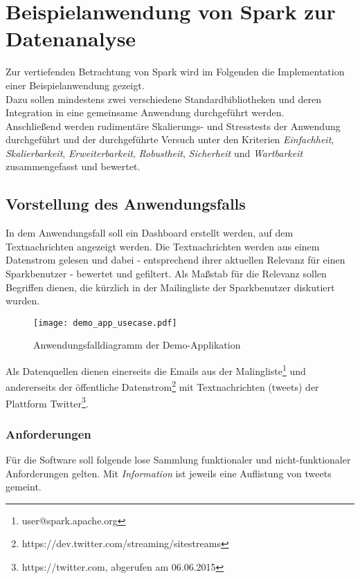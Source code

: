 \chapter{Beispielanwendung von Spark zur Datenanalyse}

Zur vertiefenden Betrachtung von Spark wird im Folgenden die Implementation einer Beispielanwendung gezeigt.\\

Dazu sollen mindestens zwei verschiedene Standardbibliotheken und deren Integration in eine gemeinsame Anwendung durchgeführt werden.\\

Anschließend werden rudimentäre Skalierungs- und Stresstests der Anwendung durchgeführt und der durchgeführte Versuch unter den Kriterien \textit{Einfachheit}, \textit{Skalierbarkeit}, \textit{Erweiterbarkeit}, \textit{Robustheit}, \textit{Sicherheit} und \textit{Wartbarkeit} zusammengefasst und bewertet.

\section{Vorstellung des Anwendungsfalls}
In dem Anwendungsfall soll ein Dashboard erstellt werden, auf dem Textnachrichten angezeigt werden.
Die Textnachrichten werden aus einem Datenstrom gelesen und dabei - entsprechend ihrer aktuellen Relevanz für einen Sparkbenutzer - bewertet und gefiltert. Als Maßstab für die Relevanz sollen Begriffen dienen, die kürzlich in der Mailingliste der Sparkbenutzer diskutiert wurden.\\

\begin{figure}[ht!]
	\centering
  \texttt{[image: demo\_app\_usecase.pdf]}
	\caption{Anwendungsfalldiagramm der Demo-Applikation}
	\label{figure:demo_app_usecase}
\end{figure}

Als Datenquellen dienen einerseits die Emails aus der Malingliste\footnote{user@spark.apache.org} und andererseits der öffentliche Datenstrom\footnote{https://dev.twitter.com/streaming/sitestreams} mit Textnachrichten (\glspl{tweet}) der Plattform Twitter\footnote{https://twitter.com, abgerufen am 06.06.2015}.

\subsection{Anforderungen}

Für die Software soll folgende lose Sammlung funktionaler und nicht-funktionaler Anforderungen gelten. Mit \textit{Information} ist jeweils eine Auflistung von \glspl{tweet} gemeint.


